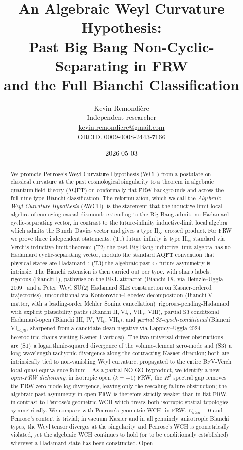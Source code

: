 \documentclass[11pt]{article}
\title{An Algebraic Weyl Curvature Hypothesis:\\
Past Big Bang Non-Cyclic-Separating in FRW\\ and the Full Bianchi Classification}
\author{Kevin Remondi\`ere\\
\small Independent researcher\\
\small \href{mailto:kevin.remondiere@gmail.com}{kevin.remondiere@gmail.com}\\
\small ORCID: \href{https://orcid.org/0009-0008-2443-7166}{0009-0008-2443-7166}}
\date{2026-05-03}
\theoremstyle{definition}
\begin{document}
\maketitle

\begin{abstract}
We promote Penrose's Weyl Curvature Hypothesis (WCH) from a postulate on classical curvature at the past cosmological singularity to a theorem in algebraic quantum field theory (AQFT) on conformally flat FRW backgrounds and across the full nine-type Bianchi classification. The reformulation, which we call the \emph{Algebraic Weyl Curvature Hypothesis} (AWCH), is the statement that the inductive-limit local algebra of comoving causal diamonds extending to the Big Bang admits no Hadamard cyclic-separating vector, in contrast to the future-infinity inductive-limit local algebra which admits the Bunch--Davies vector and gives a type II$_\infty$ crossed product. For FRW we prove three independent statements: (T1) future infinity is type II$_\infty$ standard via Verch's inductive-limit theorem; (T2) the past Big Bang inductive-limit algebra has no Hadamard cyclic-separating vector, modulo the standard AQFT convention that physical states are Hadamard~\cite{HollandsWald2001,BrunettiFredenhagenVerch2003}; (T3) the algebraic past$\leftrightarrow$future asymmetry is intrinsic. The Bianchi extension is then carried out per type, with sharp labels: rigorous (Bianchi I), pathwise on the BKL attractor (Bianchi IX, via Heinzle--Uggla 2009~\cite{HeinzleUggla2009,HeinzleUgglaAttractor2009} and a Peter--Weyl SU(2) Hadamard SLE construction on Kasner-ordered trajectories), unconditional via Kontorovich--Lebedev decomposition (Bianchi V matter, with a leading-order Mehler--Sonine cancellation), rigorous-pending-Hadamard with explicit plausibility paths (Bianchi II, VI$_0$, VII$_0$, VIII), partial S3-conditional Hadamard-open (Bianchi III, IV, VI$_h$, VII$_h$), and \emph{partial S3-epoch-conditional} (Bianchi VI$_{-1/9}$, sharpened from a candidate clean negative via Lappicy--Uggla 2024~\cite{LappicyUggla2024} heteroclinic chains visiting Kasner-I vertices). The two universal driver obstructions are (S1)~a logarithmic-squared divergence of the volume-element zero-mode and (S3)~a long-wavelength tachyonic divergence along the contracting Kasner direction; both are intrinsically tied to non-vanishing Weyl curvature, propagated to the entire BFV-Verch local-quasi-equivalence folium~\cite{Verch1994,BrunettiFredenhagenVerch2003}. As a partial NO-GO byproduct, we identify a new \emph{open-FRW dichotomy}: in isotropic open ($k=-1$) FRW, the $H^3$ spectral gap removes the FRW zero-mode log divergence, leaving only the rescaling-failure obstruction; the algebraic past asymmetry in open FRW is therefore strictly weaker than in flat FRW, in contrast to Penrose's geometric WCH which treats both isotropic spatial topologies symmetrically. We compare with Penrose's geometric WCH: in FRW, $C_{abcd}\equiv 0$ and Penrose's content is trivial; in vacuum Kasner and in all genuinely anisotropic Bianchi types, the Weyl tensor diverges at the singularity and Penrose's WCH is geometrically violated, yet the algebraic WCH continues to hold (or to be conditionally established) wherever a Hadamard state has been constructed. Open 
\end{abstract}
\end{document}
